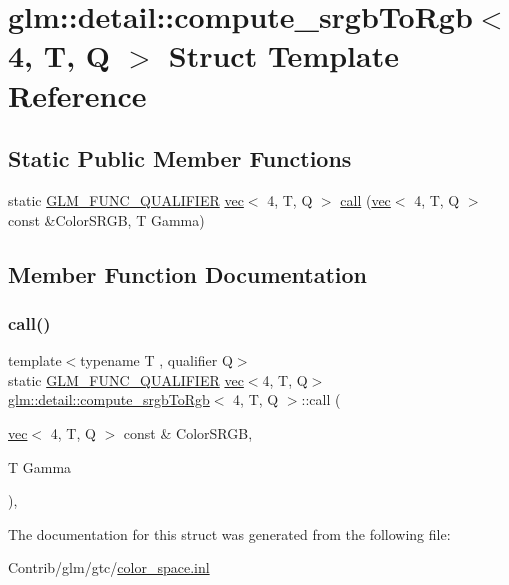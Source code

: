 \hypertarget{structglm_1_1detail_1_1compute__srgb_to_rgb_3_014_00_01_t_00_01_q_01_4}{}\section{glm\+:\+:detail\+:\+:compute\+\_\+srgb\+To\+Rgb$<$ 4, T, Q $>$ Struct Template Reference}
\label{structglm_1_1detail_1_1compute__srgb_to_rgb_3_014_00_01_t_00_01_q_01_4}
\subsection*{Static Public Member Functions}
\begin{DoxyCompactItemize}
\item 
static \mbox{\hyperlink{setup_8hpp_a33fdea6f91c5f834105f7415e2a64407}{G\+L\+M\+\_\+\+F\+U\+N\+C\+\_\+\+Q\+U\+A\+L\+I\+F\+I\+ER}} \mbox{\hyperlink{structglm_1_1vec}{vec}}$<$ 4, T, Q $>$ \mbox{\hyperlink{structglm_1_1detail_1_1compute__srgb_to_rgb_3_014_00_01_t_00_01_q_01_4_abda95674c23692a1c21f2d141ca2e024}{call}} (\mbox{\hyperlink{structglm_1_1vec}{vec}}$<$ 4, T, Q $>$ const \&Color\+S\+R\+GB, T Gamma)
\end{DoxyCompactItemize}


\subsection{Member Function Documentation}
\mbox{\label{structglm_1_1detail_1_1compute__srgb_to_rgb_3_014_00_01_t_00_01_q_01_4_abda95674c23692a1c21f2d141ca2e024}} 
\subsubsection{\texorpdfstring{call()}{call()}}
{\footnotesize\ttfamily template$<$typename T , qualifier Q$>$ \\
static \mbox{\hyperlink{setup_8hpp_a33fdea6f91c5f834105f7415e2a64407}{G\+L\+M\+\_\+\+F\+U\+N\+C\+\_\+\+Q\+U\+A\+L\+I\+F\+I\+ER}} \mbox{\hyperlink{structglm_1_1vec}{vec}}$<$4, T, Q$>$ \mbox{\hyperlink{structglm_1_1detail_1_1compute__srgb_to_rgb}{glm\+::detail\+::compute\+\_\+srgb\+To\+Rgb}}$<$ 4, T, Q $>$\+::call (\begin{DoxyParamCaption}\item[{\mbox{\hyperlink{structglm_1_1vec}{vec}}$<$ 4, T, Q $>$ const \&}]{Color\+S\+R\+GB,  }\item[{T}]{Gamma }\end{DoxyParamCaption})\hspace{0.3cm}{\ttfamily [inline]}, {\ttfamily [static]}}



The documentation for this struct was generated from the following file\+:\begin{DoxyCompactItemize}
\item 
Contrib/glm/gtc/\mbox{\hyperlink{gtc_2color__space_8inl}{color\+\_\+space.\+inl}}\end{DoxyCompactItemize}
